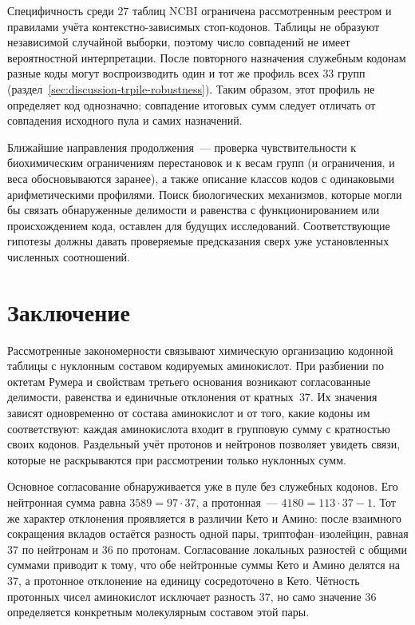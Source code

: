 \documentclass[11pt,a4paper]{article}
\renewcommand{\_}{\origunderscore\allowbreak}
\begin{document}
Специфичность среди $27$ таблиц NCBI ограничена рассмотренным
реестром и правилами учёта контекстно-зависимых стоп-кодонов.
Таблицы не образуют независимой случайной выборки, поэтому
число совпадений не имеет вероятностной интерпретации.
После повторного назначения служебным кодонам разные коды
могут воспроизводить один и тот же профиль всех $33$ групп
(раздел~\ref{sec:discussion-trpile-robustness}). Таким образом,
этот профиль не определяет код однозначно; совпадение
итоговых сумм следует отличать от совпадения исходного пула
и самих назначений.

Ближайшие направления продолжения~--- проверка чувствительности
к биохимическим ограничениям перестановок и к весам групп
(и ограничения, и веса обосновываются заранее), а также
описание классов кодов с одинаковыми
арифметическими профилями. Поиск биологических механизмов,
которые могли бы связать обнаруженные делимости и равенства
с функционированием или происхождением кода, оставлен для
будущих исследований. Соответствующие гипотезы должны давать
проверяемые предсказания сверх уже установленных численных
соотношений.

\section{Заключение}
\label{sec:conclusion}

Рассмотренные закономерности связывают химическую организацию
кодонной таблицы с нуклонным составом кодируемых аминокислот.
При разбиении по октетам Румера и свойствам третьего основания
возникают согласованные делимости, равенства и единичные
отклонения от кратных~$37$. Их значения зависят одновременно
от состава аминокислот и от того, какие кодоны им соответствуют:
каждая аминокислота входит в групповую сумму с кратностью
своих кодонов. Раздельный учёт протонов и нейтронов позволяет
увидеть связи, которые не раскрываются при рассмотрении
только нуклонных сумм.

Основное согласование обнаруживается уже в пуле без служебных
кодонов. Его нейтронная сумма равна $3589=97\cdot37$, а
протонная~--- $4180=113\cdot37-1$. Тот же характер отклонения
проявляется в различии Кето и Амино: после взаимного сокращения
вкладов остаётся разность одной пары, триптофан--изолейцин,
равная $37$ по нейтронам и $36$ по протонам.
Согласование локальных разностей с общими суммами приводит
к тому, что обе нейтронные суммы Кето и Амино делятся на~$37$,
а протонное отклонение на единицу сосредоточено в Кето.
Чётность протонных чисел аминокислот исключает разность $37$,
но само значение $36$ определяется конкретным молекулярным
составом этой пары.
\end{document}
